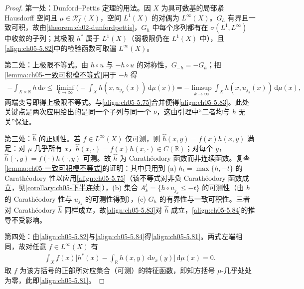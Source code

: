 \documentclass[../../main.tex]{subfiles}
\begin{document}
\begin{proof}
第一处：Dunford--Pettis 定理的用法。因 $X$ 为具可数基的局部紧 Hausdorff 空间且 $\mu\in\mathscr{R}^+_f(X)$，空间 $L^1(X)$ 的对偶为 $L^\infty(X)$。$G_h$ 有界且一致可积，故由\cref{theorem:ch02-dunfordpettis}，$G_h$ 中每个序列都有在 $\sigma(L^1,L^\infty)$ 中收敛的子列；其极限 $h^*$ 属于 $L^1(X)$（弱极限仍在 $L^1(X)$ 中），且\eqref{align:ch05-5.82}中的检验函数可取遍 $L^\infty(X)$。

第二处：上极限不等式。由 $h\circ u$ 与 $-h\circ u$ 的对称性，$G_{-h}=-G_h$；把\cref{lemma:ch05-一致可积模不等式}用于 $-h$ 得
\begin{align*}
-\int_{X\times\mathbb{R}}h\,\mathrm{d}\nu\leqslant\liminf_{k\to\infty}\Big(-\int_Xh(x,u_{j_k}(x))\,\mathrm{d}\mu(x)\Big)
=-\limsup_{k\to\infty}\int_Xh(x,u_{j_k}(x))\,\mathrm{d}\mu(x),
\end{align*}
两端变号即得上极限不等式。与\eqref{align:ch05-5.75}合并便得\eqref{align:ch05-5.83}。此处关键点是两次应用给出的是同一个子列与同一个 $\nu$，这由引理中“二者均与 $h$ 无关”保证。

第三处：$\hat h$ 的正则性。若 $f\in L^\infty(X)$ 仅可测，则 $\hat h(x,y)=f(x)h(x,y)$ 满足：对 $\mu$-几乎所有 $x$，$\hat h(x,\cdot)=f(x)h(x,\cdot)\in C(\mathbb{R})$；对每个 $y$，$\hat h(\cdot,y)=f(\cdot)h(\cdot,y)$ 可测。故 $\hat h$ 为 Carathéodory 函数而非连续函数。复查\cref{lemma:ch05-一致可积模不等式}的证明：其中只用到 (a) $h_t=\max\{h,-t\}$ 的 Carathéodory 性以应用\eqref{align:ch05-5.75}（该不等式对非负 Carathéodory 函数成立，见\cref{corollary:ch05-下半连续}），(b) 集合 $A^t_k=\{h\circ u_{j_k}\leqslant-t\}$ 的可测性（由 $h$ 的 Carathéodory 性与 $u_{j_k}$ 的可测性得到），(c) $G_h$ 的有界性与一致可积性。三者对 Carathéodory $\hat h$ 同样成立，故\eqref{align:ch05-5.83}对 $\hat h$ 成立，\eqref{align:ch05-5.84}的推导不受影响。

第四处：由\eqref{align:ch05-5.82}与\eqref{align:ch05-5.84}得\eqref{align:ch05-5.81}。两式左端相同，故对任意 $f\in L^\infty(X)$ 有
\begin{align*}
\int_Xf(x)\Big[h^*(x)-\int_{\mathbb{R}}h(x,y)\,\mathrm{d}\nu_x(y)\Big]\,\mathrm{d}\mu(x)=0.
\end{align*}
取 $f$ 为该方括号的正部所对应集合（可测）的特征函数，即知方括号 $\mu$-几乎处处为零，此即\eqref{align:ch05-5.81}。
\end{proof}
\end{document}
